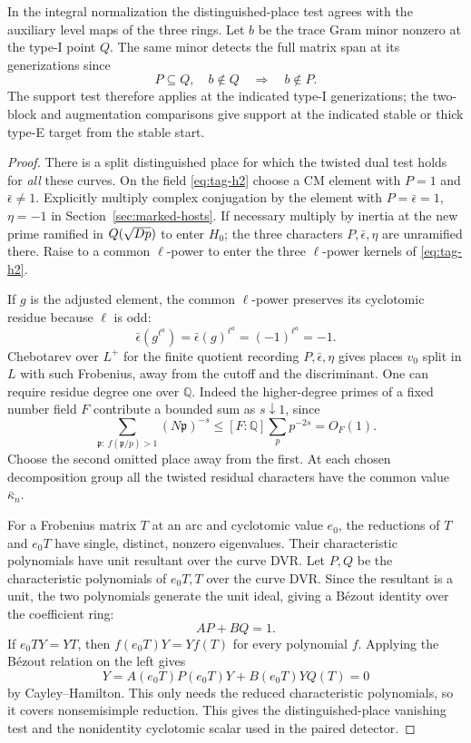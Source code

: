\begin{lemma}
\label{lem:fitted-marked-support-test}
In the integral normalization the distinguished-place test agrees
with the auxiliary level maps of the three rings. Let \(b\) be the trace Gram minor nonzero at the type-I point \(Q\).
The same minor detects the full matrix span at its generizations since
\[
           P\subseteq Q,\quad b\notin Q\quad\Longrightarrow\quad b\notin P.
\]
The support test therefore applies at the indicated type-I generizations;
the two-block and augmentation comparisons give support at the
indicated stable or thick type-E target from the stable start.
\end{lemma}

\begin{proof}
There is a split distinguished place for which the twisted dual
test holds for \emph{all} these curves. On the field \eqref{eq:tag-h2} choose
a CM element with \(P=1\) and \(\bar\epsilon\ne1\). Explicitly
multiply complex conjugation by the element with \(P=\bar\epsilon=1\),
\(\eta=-1\) in Section~\ref{sec:marked-hosts}. If necessary multiply
by inertia at the new prime ramified in \(Q(\sqrt{Dp})\) to enter
\(H_0\); the three characters \(P,\bar\epsilon,\eta\) are unramified
there. Raise to a common \(\ell\)-power to enter the three
\(\ell\)-power kernels of \eqref{eq:tag-h2}.

If \(g\) is the adjusted element, the common \(\ell\)-power preserves its cyclotomic residue because \(\ell\) is odd: 
\[
 \bar\epsilon(g^{\ell^a})=\bar\epsilon(g)^{\ell^a}=(-1)^{\ell^a}=-1.
\]
 Chebotarev over \(L^+\) for the finite quotient recording
\(P,\bar\epsilon,\eta\) gives places \(v_0\) split in \(L\) with
such Frobenius, away from the cutoff and the discriminant. One can require residue degree one over \(\mathbb Q\). Indeed the higher-degree primes of a fixed number field \(F\) contribute a bounded sum as \(s\downarrow1\), since
\[
 \sum_{\mathfrak p:\ f(\mathfrak p/p)>1}(N\mathfrak p)^{-s}\le [F:\mathbb Q]\sum_p p^{-2s}=O_F(1).
\] Choose the second omitted place away from
the first. At each chosen decomposition group all the twisted
residual characters have the common value \(\bar\kappa_n\).

For a Frobenius matrix \(T\) at an arc and cyclotomic value \(e_0\),
the reductions of \(T\) and \(e_0 T\) have single, distinct,
nonzero eigenvalues. Their characteristic polynomials have unit
resultant over the curve DVR. Let \(P,Q\) be the characteristic polynomials of
\(e_0 T,T\) over the curve DVR. Since the resultant is a unit, the two polynomials generate the unit ideal, giving a B\'ezout identity over the coefficient ring:
\[
 AP+BQ=1 .
\]
If \(e_0TY=YT\), then \(f(e_0T)Y=Yf(T)\) for every
polynomial \(f\). Applying the Bézout relation on the
left gives
\[
  Y=A(e_0T)P(e_0T)Y+B(e_0T)YQ(T)=0
\]
by Cayley--Hamilton. This only needs the reduced
characteristic polynomials, so it covers nonsemisimple
reduction. This gives the distinguished-place vanishing test and the nonidentity cyclotomic scalar used in the paired detector.


\end{proof}
